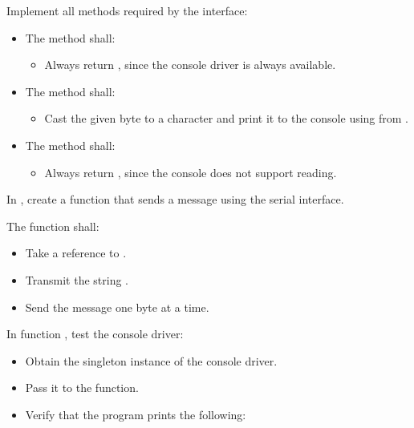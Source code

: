 Implement all methods required by the interface:
\begin{itemize}
  \item The method  shall:
  \begin{itemize}
    \item Always return , since the console driver is always available.
  \end{itemize}
  \item The method  shall:
  \begin{itemize}
    \item Cast the given byte to a character and print it to the console using
       from .
  \end{itemize}
  \item The method  shall:
  \begin{itemize}
    \item Always return , since the console does not support reading.
  \end{itemize}
\end{itemize}

\label{c3:set:4}

\label{c3:ex:4.1}
In , create a function  that sends a message using the
serial interface.

The function shall:
\begin{itemize}
  \item Take a reference to .
  \item Transmit the string .
  \item Send the message one byte at a time.
\end{itemize}

In function , test the console driver:
\begin{itemize}
  \item Obtain the singleton instance of the console driver.
  \item Pass it to the  function.
  \item Verify that the program prints the following:
\end{itemize}

